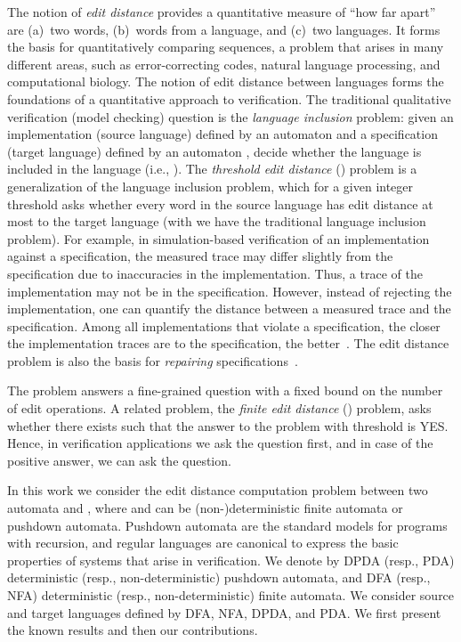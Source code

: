 \documentclass{CSML}
\begin{document}
\smallskip{}
The notion of {\em edit distance} provides a quantitative measure of 
``how far apart'' are (a)~two words, (b)~words from a language, and (c)~two 
languages.
It forms the basis for quantitatively comparing sequences, a problem that 
arises in many different areas, such as error-correcting codes, 
natural language processing, and computational biology.
The notion of edit distance between languages forms the foundations of a 
quantitative approach to verification.
The traditional qualitative verification (model checking) question is the 
\emph{language inclusion} problem: given an implementation (source language) 
defined by an automaton  and a specification (target language) 
defined by an automaton , decide whether the language 
 is included in the language  
(i.e., ). 
The \emph{threshold edit distance} () problem is a generalization of the 
language inclusion problem, which for a given integer threshold 
asks whether every word in the source language  has edit 
distance at most  to the target language  
(with  we have the traditional language inclusion problem).
For example, in simulation-based verification of an implementation against a 
specification, the measured trace may differ slightly from the 
specification due to inaccuracies in the implementation. 
Thus, a trace of the implementation may not be in the specification. 
However, instead of rejecting the implementation, one can quantify the 
distance between a measured trace and the specification.
Among all implementations that violate a specification, the closer the 
implementation traces are to the specification, the 
better~\cite{Chatterjee08quantitativelanguages,chatterjee2012nested,ModelMeasuring}.
The edit distance problem is also the basis for {\em repairing} 
specifications~\cite{riveros,boundedRiveros}. 

The  problem answers a fine-grained question with a fixed bound on the number of edit operations. 
A related problem, the \emph{finite edit distance} () problem, asks
whether there exists  such that the answer to the  problem with threshold
 is YES. Hence, in verification applications we ask the  question first, 
and in case of the positive answer, we can ask the  question.




\smallskip{}
In this work we consider the edit distance computation problem between two 
automata  and , where  and  can be (non-)deterministic finite 
automata or pushdown automata.
Pushdown automata are the standard models for programs with recursion, 
and regular languages are canonical to express the basic properties of systems 
that arise in verification.
We denote by DPDA (resp., PDA) deterministic (resp., non-deterministic) 
pushdown automata, and DFA (resp., NFA) deterministic 
(resp., non-deterministic) finite automata.
We consider source and target languages defined by DFA, NFA, DPDA, and PDA. 
We first present the known results and then our contributions.
\end{document}
